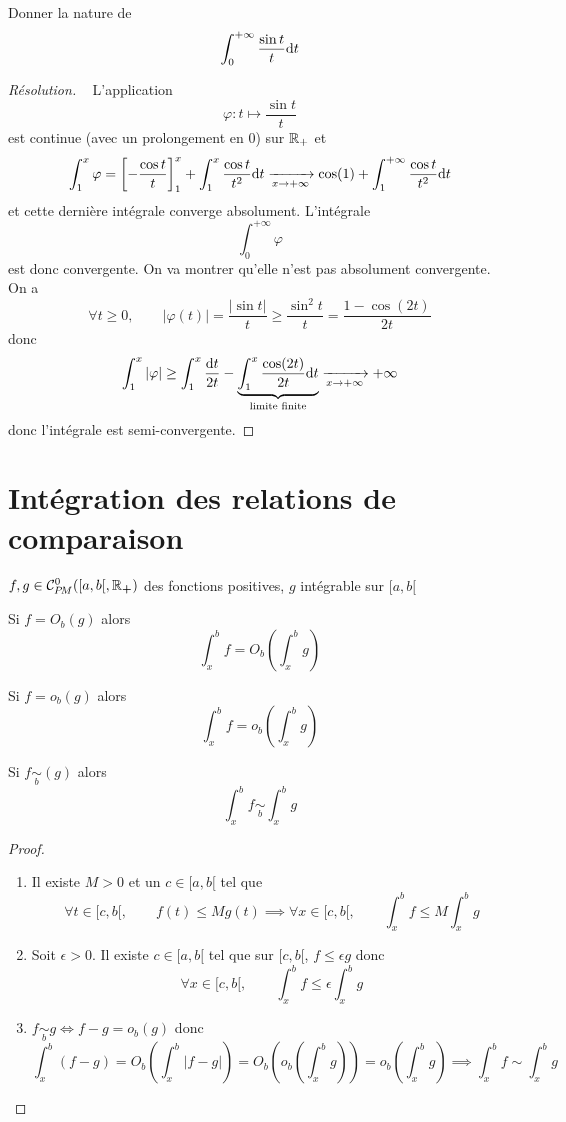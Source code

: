\begin{exo}
    Donner la nature de \[
        \int_0^{+\infty}\frac{\sin t}t\mathrm{d} t
    \]
\end{exo}

\begin{proof}[Résolution]~
    L'application \[
        \varphi:t\longmapsto \frac{\sin t}t
    \]
    est continue (avec un prolongement en $0$) sur $\mathbb R_+$ et \[
        \int_1^x\varphi= \left[ -\frac{\cos t}t \right]_1^x+\int_1^x\frac{\cos t}{t^2}\mathrm{d} t\xrightarrow[x\to+\infty]{}\cos (1)+\int_1^{+\infty}\frac{\cos t}{t^2}\mathrm{d} t
    \]
    et cette dernière intégrale converge absolument. L'intégrale \[
        \int_0^{+\infty}\varphi
    \] est donc convergente.
    On va montrer qu'elle n'est pas absolument convergente. On a \[
        \forall t\geq 0, \qquad |\varphi(t)|= \frac{|\sin t|}t\geq \frac{\sin^2t}{t}=\frac{1-\cos(2t)}{2t}
    \]
    donc \[
        \int_1^x|\varphi|\geq \int_1^x\frac{\mathrm{d} t}{2t}-\underbrace{\int_1^x\frac{\cos(2t)}{2t}\mathrm{d} t}_{\text{limite finite}}\xrightarrow[x\to+\infty]{}+\infty
    \]
    donc l'intégrale est semi-convergente.
\end{proof}


\section{Intégration des relations de comparaison}

\needspace{3cm}
\begin{thm}
    \Hyp $f,g\in \CPM([a, b[, \R_{\bm+})$ des fonctions positives, $g$ intégrable sur $[a, b[$
    \begin{concenum}
    \item Si $f=O_b(g)$ alors \[
            \int_x^bf=O_b \left( \int_x^bg \right)
        \]
    \item Si $f=o_b(g)$ alors \[
            \int_x^bf=o_b \left( \int_x^bg \right)
        \]
    \item Si $f\underset b\sim(g)$ alors \[
            \int_x^bf\underset b\sim \int_x^bg
        \]
    \end{concenum}
\end{thm}

\begin{proof}~
    \begin{enumerate}
        \item Il existe $M>0$ et un $c\in[a, b[$ tel que \[
                \forall t\in [c, b[,\qquad  f(t)\leq Mg(t)\implies \forall x\in[c, b[, \qquad\int_x^bf\leq M\int_x^bg
            \]
        \item Soit $\epsilon>0$. Il existe $c\in [a, b[$ tel que sur $[c, b[$, $f\leq \epsilon g$ donc \[
                \forall x\in [c, b[, \qquad \int_x^bf\leq \epsilon\int_x^bg
            \]
        \item $f\underset b\sim g\iff f-g=o_b(g)$ donc \[
                \int_x^b(f-g)=O_b \left( \int_x^b|f-g| \right)=O_b \left( o_b \left( \int_x^bg \right) \right)=o_b \left( \int_x^b g \right)\implies \int_x^bf\sim\int_x^bg
            \]
    \end{enumerate}
\end{proof}


